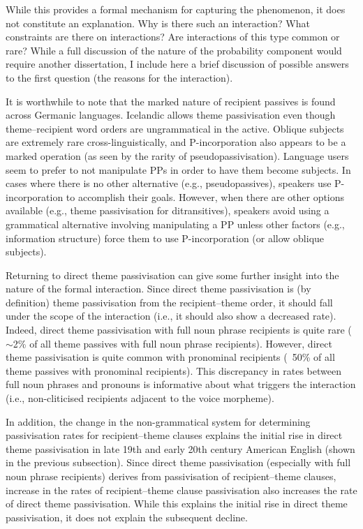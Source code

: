 	While this provides a formal mechanism for capturing the phenomenon, it does not constitute an explanation. Why is there such an interaction? What constraints are there on interactions? Are interactions of this type common or rare? While a full discussion of the nature of the probability component would require another dissertation, I include here a brief discussion of possible answers to the first question (the reasons for the interaction). 

	It is worthwhile to note that the marked nature of recipient passives is found across Germanic languages. Icelandic allows theme passivisation even though theme--recipient word orders are ungrammatical in the active. Oblique subjects are extremely rare cross-linguistically, and P-incorporation also appears to be a marked operation (as seen by the rarity of pseudopassivisation). Language users seem to prefer to not manipulate PPs in order to have them become subjects. In cases where there is no other alternative (e.g., pseudopassives), speakers use P-incorporation to accomplish their goals. However, when there are other options available (e.g., theme passivisation for ditransitives), speakers avoid using a grammatical alternative involving manipulating a PP unless other factors (e.g., information structure) force them to use P-incorporation (or allow oblique subjects). 

	Returning to direct theme passivisation can give some further insight into the nature of the formal interaction. Since direct theme passivisation is (by definition) theme passivisation from the recipient--theme order, it should fall under the scope of the interaction (i.e., it should also show a decreased rate). Indeed, direct theme passivisation with full noun phrase recipients is quite rare ($\sim$2\% of all theme passives with full noun phrase recipients). However, direct theme passivisation is quite common with pronominal recipients (~50\% of all theme passives with pronominal recipients). This discrepancy in rates between full noun phrases and pronouns is informative about what triggers the interaction (i.e., non-cliticised recipients adjacent to the voice morpheme).

	In addition, the change in the non-grammatical system for determining passivisation rates for recipient--theme clauses explains the initial rise in direct theme passivisation in late 19th and early 20th century American English (shown in the previous subsection). Since direct theme passivisation (especially with full noun phrase recipients) derives from passivisation of recipient--theme clauses, increase in the rates of recipient--theme clause passivisation also increases the rate of direct theme passivisation. While this explains the initial rise in direct theme passivisation, it does not explain the subsequent decline.
	
